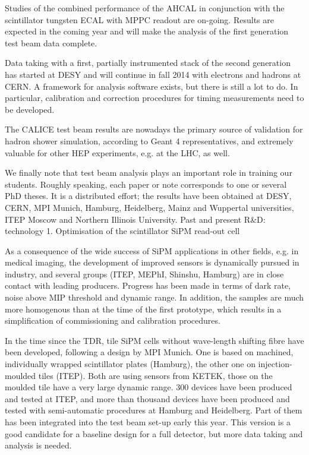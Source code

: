 Studies of the combined performance of the AHCAL in conjunction with the scintillator tungsten ECAL with MPPC readout are on-going. Results are expected in the coming year and will make the analysis of the first generation test beam data complete. 

Data taking with a first, partially instrumented stack of the second generation has started at DESY and will continue in fall 2014 with electrons and hadrons at CERN. A framework for analysis software exists, but there is still a lot to do. In particular, calibration and correction procedures for timing measurements need to be developed. 

The CALICE test beam results are nowadays the primary source of validation for hadron shower simulation, according to Geant 4 representatives, and extremely valuable for other HEP experiments, e.g. at the LHC, as well. 

We finally note that test beam analysis plays an important role in training our students. Roughly speaking, each paper or note corresponds to one or several PhD theses. It is a distributed effort; the results have been obtained at DESY, CERN, MPI Munich, Hamburg, Heidelberg, Mainz and Wuppertal universities, ITEP Moscow and Northern Illinois University.
Past and present R\&D: technology 
1.  Optimisation of the scintillator SiPM read-out cell

As a consequence of the wide success of SiPM applications in other fields, e.g. in medical imaging, the development of improved sensors is dynamically pursued in industry, and several groups (ITEP, MEPhI, Shinshu, Hamburg) are in close contact with leading producers. Progress has been made in terms of dark rate, noise above MIP threshold and dynamic range. In addition, the samples are much more homogenous than at the time of the first prototype, which results in a simplification of commissioning and calibration procedures. 

In the time since the TDR, tile SiPM cells without wave-length shifting fibre have been developed, following a design by MPI Munich. One is based on machined, individually wrapped scintillator plates (Hamburg), the other one on injection-moulded tiles (ITEP). Both are using sensors from KETEK, those on the moulded tile have a very large dynamic range. 300 devices have been produced and tested at ITEP, and more than thousand devices have been produced and tested with semi-automatic procedures at Hamburg and Heidelberg. Part of them has been integrated into the test beam set-up early this year. This version is a good candidate for a baseline design for a full detector, but more data taking and analysis is needed. 

